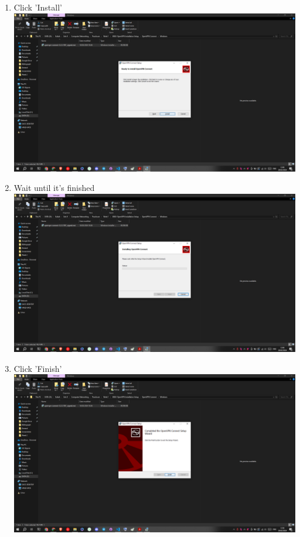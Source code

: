 \documentclass[12pt,titlepage]{article}
\begin{document}
\begin{enumerate}
    \item Click 'Install' \\ \includegraphics[width=.9\textwidth]{images/figures/Screenshot (446).png}
    \newpage
    \item Wait until it's finished \\ \includegraphics[width=.9\textwidth]{images/figures/Screenshot (447).png}
    \item Click 'Finish' \\ \includegraphics[width=.9\textwidth]{images/figures/Screenshot (448).png}
    \newpage

\end{enumerate}
\end{document}
